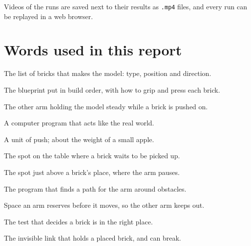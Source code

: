 \documentclass[11pt,a4paper]{article}
\begin{document}
Videos of the runs are saved next to their results as \texttt{.mp4} files, and
every run can be replayed in a web browser.

\section{Words used in this report}

\begin{description}[leftmargin=2.6cm, style=nextline]
\item[Blueprint] The list of bricks that makes the model: type, position and direction.
\item[Plan] The blueprint put in build order, with how to grip and press each brick.
\item[Support] The other arm holding the model steady while a brick is pushed on.
\item[Simulation] A computer program that acts like the real world.
\item[Newton (N)] A unit of push; about the weight of a small apple.
\item[Feeder] The spot on the table where a brick waits to be picked up.
\item[Hover point] The spot just above a brick's place, where the arm pauses.
\item[Route planner] The program that finds a path for the arm around obstacles.
\item[Booking] Space an arm reserves before it moves, so the other arm keeps out.
\item[Snap check] The test that decides a brick is in the right place.
\item[Glue joint] The invisible link that holds a placed brick, and can break.
\end{description}
\end{document}
